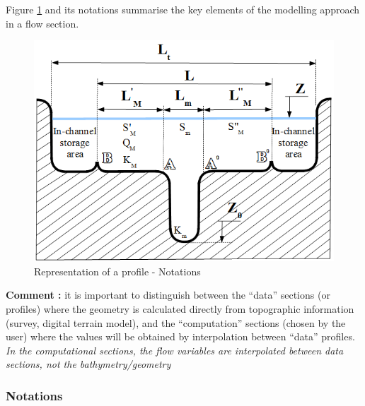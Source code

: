 Figure \ref{SchemProf} and its notations summarise the key elements of the modelling approach in a flow section.

\begin{figure}[h]
 \begin{center}
  \includegraphics[scale=1.5]{Figures/Schema_profil.eps}
  \caption{Representation of a profile - Notations}
  \label{SchemProf}
 \end{center}
\end{figure}

\vspace{0.5cm}

\textbf{Comment :}
it is important to distinguish between the ``data'' sections (or profiles) where the geometry is calculated directly from topographic information (survey, digital terrain model), and the ``computation'' sections (chosen by the user) where the values will be obtained by interpolation between ``data'' profiles. 
\textit{In the computational sections, the flow variables are interpolated between data sections, not the bathymetry/geometry}

\subsubsection{Notations} \label{secNot}

